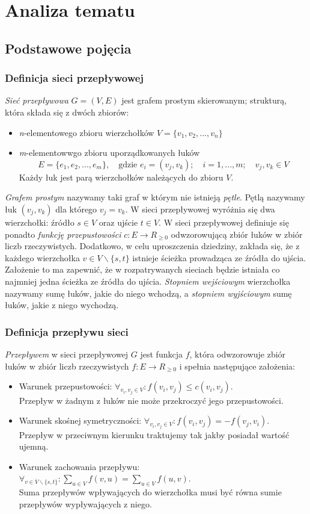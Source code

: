 \chapter{Analiza tematu}
\section{Podstawowe pojęcia}
\subsection{Definicja sieci przepływowej}\label{ssec:graphDef}
\emph{Sieć przepływowa} $ G=(V, E) $ jest grafem prostym skierowanym; strukturą, która składa się z dwóch zbiorów:
\begin{itemize}
	\item \textit{n}-elementowego zbioru wierzchołków $ V = \{v_1,v_2,...,v_n \}$
	\item \textit{m}-elementowwgo zbioru uporządkowanych łuków
	$$ E = \{e_1,e_2,...,e_m \},\quad \text{gdzie } e_i=(v_j,v_k);\quad i=1,...,m;\quad v_j,v_k\in V$$
	Każdy łuk jest parą wierzchołków należących do zbioru $ V $.
\end{itemize}
\emph{Grafem prostym} nazywamy taki graf w którym nie istnieją \emph{pętle}. Pętlą nazywamy łuk $ (v_j,v_k) $ dla którego $ v_j=v_k $. W sieci przepływowej wyróżnia się dwa wierzchołki: źródło $ s \in V $ oraz ujście $ t \in V $. W sieci przepływowej definiuje się ponadto \emph{funkcję przepustowości} $ c : E\rightarrow R_{\ge0}$ odwzorowującą zbiór łuków w zbiór liczb rzeczywistych. Dodatkowo, w celu uproszczenia dziedziny, zakłada się, że z każdego wierzchołka $ v\in V\backslash\{s, t\} $ istnieje ścieżka prowadząca ze źródła do ujścia. Założenie to ma zapewnić, że w rozpatrywanych sieciach będzie istniała co najmniej jedna ścieżka ze źródła do ujścia.
\emph{Stopniem wejściowym} wierzchołka nazywamy sumę łuków, jakie do niego wchodzą, a \emph{stopniem wyjściowym} sumę łuków, jakie z niego wychodzą.
\subsection{Definicja przepływu sieci}\label{ssec:flowDef}
\emph{Przepływem} w sieci przepływowej $ G $ jest funkcja $ f $, która odwzorowuje zbiór łuków w zbiór liczb rzeczywistych $ f : E \rightarrow R_{\ge0} $ i spełnia następujące założenia:
\begin{itemize}
	\item Warunek przepustowości: $ \forall_{v_i, v_j\in V} : f(v_i, v_j) \le c(v_i, v_j) $.\\Przepływ w żadnym z łuków nie może przekroczyć jego przepustowości.
	\item Warunek skośnej symetryczności: $ \forall_{v_i, v_j\in V} : f(v_i, v_j) = -f(v_j, v_i) $.\\Przepływ w przeciwnym kierunku traktujemy tak jakby posiadał wartość ujemną.
	\item Warunek zachowania przepływu: $ \forall_{v\in V\backslash\{s, t\}} : \sum_{u\in V}f(v,u)=\sum_{u\in V}f(u,v) $.\\Suma przepływów wpływających do wierzchołka musi być równa sumie przepływów wypływających z niego.
\end{itemize}
